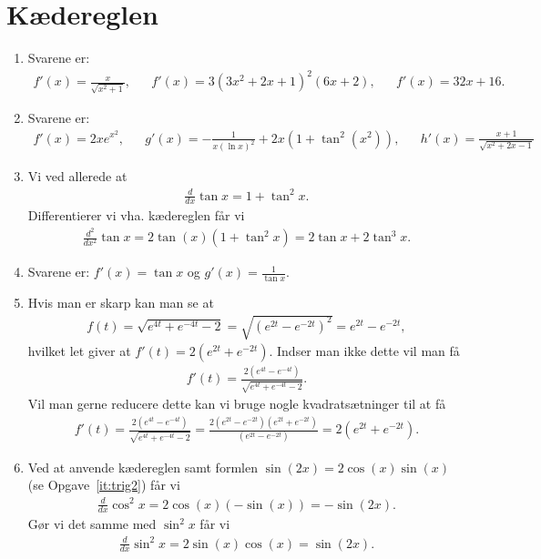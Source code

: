 \section{Kædereglen}
\begin{enumerate}
			
	\item Svarene er:
	\begin{align*}
	f'(x)=\frac{x}{\sqrt{x^2+1}},&&f'(x)=3(3x^2+2x+1)^2(6x+2),&&f'(x)=32x+16.
	\end{align*}
	
	\item Svarene er:
	\begin{align*}
	f'(x)=2xe^{x^2},&& g'(x)=-\frac{1}{x(\ln x)^2}+2x(1+\tan^2(x^2)),&&h'(x)=\frac{x+1}{\sqrt{x^2+2x-1}}
	\end{align*}
	
	\item Vi ved allerede at
	\begin{align*}
	\frac{d}{dx} \tan x=1+\tan^2 x.
	\end{align*}
	Differentierer vi vha. kædereglen får vi
	\begin{align*}
	\frac{d^2}{dx^2}\tan x=2\tan(x)(1+\tan^2 x)=2\tan x+2\tan^3x.
	\end{align*}
	
	\item Svarene er: $f'(x)=\tan x$ og $g'(x)=\frac{1}{\tan x}$.
	
	\item Hvis man er skarp kan man se at
	\begin{align*}
	f(t)=\sqrt{e^{4t}+e^{-4t}-2}=\sqrt{(e^{2t}-e^{-2t})^2}=e^{2t}-e^{-2t},
	\end{align*}
	hvilket let giver at $f'(t)=2(e^{2t}+e^{-2t})$. Indser man ikke dette vil man få
	\begin{align*}
	f'(t)=\frac{2(e^{4t}-e^{-4t})}{\sqrt{e^{4t}+e^{-4t}-2}}.
	\end{align*}
	Vil man gerne reducere dette kan vi bruge nogle kvadratsætninger til at få
	\begin{align*}
	f'(t)=\frac{2(e^{4t}-e^{-4t})}{\sqrt{e^{4t}+e^{-4t}-2}}=\frac{2(e^{2t}-e^{-2t})(e^{2t}+e^{-2t})}{(e^{2t}-e^{-2t})}=2(e^{2t}+e^{-2t}).
	\end{align*}
	
	\item Ved at anvende kædereglen samt formlen $\sin(2x)=2\cos(x)\sin(x)$ (se Opgave~\ref{it:trig2}) får vi
	\begin{align*}
	\frac{d}{dx}\cos^2x=2\cos(x)(-\sin(x))=-\sin(2x).
	\end{align*}
	Gør vi det samme med $\sin^2x$ får vi
	\begin{align*}
	\frac{d}{dx}\sin^2x=2\sin(x)\cos(x)=\sin(2x).
	\end{align*}
	

\end{enumerate}
